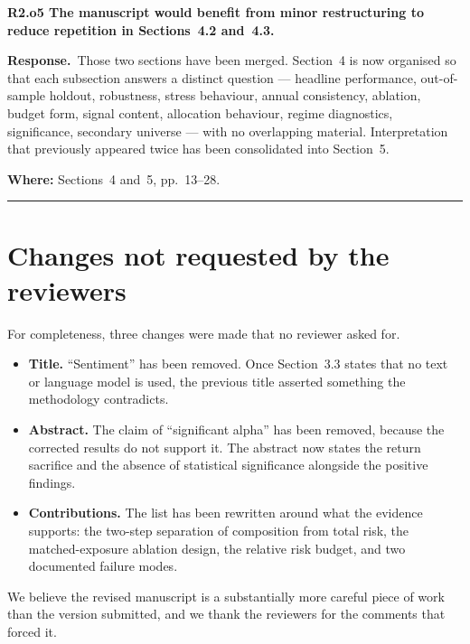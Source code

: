 \documentclass[11pt,a4paper]{article}
\newcommand{\rc}[1]{\par\medskip\noindent\textbf{#1}\par\nopagebreak}
\newcommand{\resp}{\par\noindent\textbf{Response.}\ }
\newcommand{\where}[1]{\par\smallskip\noindent\textcolor{blue!55!black}{\textbf{Where:} #1}\par}
\begin{document}
\rc{R2.o5 The manuscript would benefit from minor restructuring to reduce repetition in
Sections~4.2 and~4.3.}

\resp Those two sections have been merged. Section~4 is now organised so that each
subsection answers a distinct question --- headline performance, out-of-sample
holdout, robustness, stress
behaviour, annual consistency, ablation, budget form, signal content, allocation
behaviour, regime diagnostics, significance, secondary universe --- with no overlapping
material. Interpretation that previously appeared twice has been consolidated into
Section~5.
\where{Sections~4 and~5, pp.~13--28.}

\bigskip
\hrule
\section*{Changes not requested by the reviewers}

For completeness, three changes were made that no reviewer asked for.

\begin{itemize}
\item \textbf{Title.} ``Sentiment'' has been removed. Once Section~3.3 states that no
text or language model is used, the previous title asserted something the methodology
contradicts.
\item \textbf{Abstract.} The claim of ``significant alpha'' has been removed, because the
corrected results do not support it. The abstract now states the return sacrifice and
the absence of statistical significance alongside the positive findings.
\item \textbf{Contributions.} The list has been rewritten around what the evidence
supports: the two-step separation of composition from total risk, the matched-exposure
ablation design, the relative risk budget, and two documented failure modes.
\end{itemize}

We believe the revised manuscript is a substantially more careful piece of work than the
version submitted, and we thank the reviewers for the comments that forced it.
\end{document}
